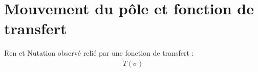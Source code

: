\section{Mouvement du pôle et fonction de transfert}

\begin{frame}
   Ren et Nutation observé relié par une fonction de transfert :
   $$ \tilde{T}(\sigma)  $$
\end{frame}



